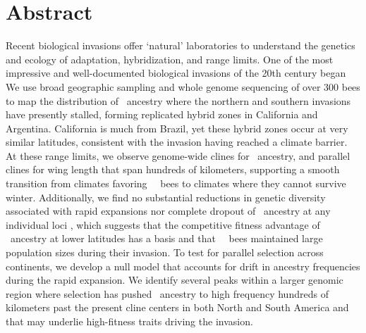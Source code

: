 \section*{Abstract}
Recent biological invasions offer ‘natural’ laboratories to understand the genetics and ecology of adaptation, hybridization, and range limits. One of the most impressive and well-documented biological invasions of the 20th century began  
We use broad geographic sampling and whole genome sequencing of over 300 bees to map the distribution of \scutellata\ ancestry where the northern and southern invasions have presently stalled, forming replicated hybrid zones  in California and Argentina. California is much  from Brazil, yet these hybrid zones occur at very similar latitudes, consistent with the invasion having reached a climate barrier. At these range limits, we observe genome-wide clines for \scutellata\ ancestry, and parallel clines for wing length that span hundreds of kilometers, supporting a smooth transition from climates favoring \africanized\ \hyb\ bees to climates where they cannot survive winter.  Additionally, we find no substantial reductions in genetic diversity associated with rapid expansions nor complete dropout of \scutellata\ ancestry at any individual loci , which suggests that the competitive fitness advantage of \scutellata\ ancestry at lower latitudes has a  basis and that \africanized\ \hyb\ bees maintained large population sizes during their invasion. To test for parallel selection across continents, we develop a null model that accounts for drift in ancestry frequencies during the rapid expansion. We identify several peaks within a larger genomic region where selection has pushed \scutellata\ ancestry to high frequency hundreds of kilometers past the present cline centers in both North and South America and that may underlie high-fitness traits driving the invasion.

